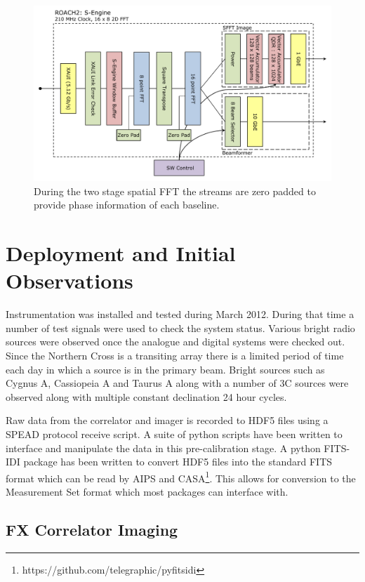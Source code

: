 \documentclass[useAMS,macros,usenatbib,onecolumn]{mn2e}
\begin{document}
\begin{figure}
    \centering
    \includegraphics[scale=0.6]{graphics/crop_sengine_block.pdf}
    \caption{During the two stage spatial FFT the streams are zero padded to provide phase information of each baseline.}
    \label{fig:seng_block}
\end{figure}

\section{Deployment and Initial Observations}
\label{observations}

Instrumentation was installed and tested during March 2012.
During that time a number of test signals were used to check the system status.
Various bright radio sources were observed once the analogue and digital systems were checked out.
Since the Northern Cross is a transiting array there is a limited period of time each day in which a source is in the primary beam.
Bright sources such as Cygnus A, Cassiopeia A and Taurus A along with a number of 3C sources were observed along with multiple constant declination 24 hour cycles.

Raw data from the correlator and imager is recorded to HDF5 files using a SPEAD protocol receive script.
A suite of python scripts have been written to interface and manipulate the data in this pre-calibration stage.
A python FITS-IDI package has been written to convert HDF5 files into the standard FITS format which can be read by AIPS and CASA\footnote{https://github.com/telegraphic/pyfitsidi}.
This allows for conversion to the Measurement Set format which most packages can interface with.

\subsection{FX Correlator Imaging}
\label{fx_results}
\end{document}
